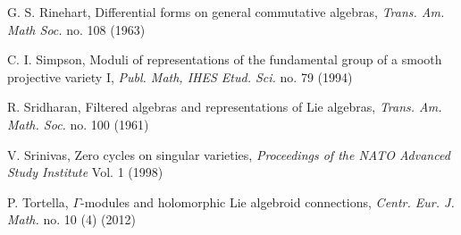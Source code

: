 \documentclass{amsart}
\theoremstyle{plain}
\theoremstyle{definition}
\theoremstyle{remark}
\numberwithin{equation}{theorem}
\begin{document}
\begin{thebibliography}{4}
 G. S. Rinehart, Differential forms on general commutative algebras, \emph{Trans. Am. Math Soc.}
no. 108 (1963)

 C. I. Simpson, Moduli of representations of the fundamental group of a smooth projective
variety I, \emph{Publ. Math, IHES Etud. Sci.} no. 79 (1994)

 R. Sridharan, Filtered algebras and representations of Lie algebras, \emph{Trans. Am. Math. Soc.}
no. 100 (1961)

 V. Srinivas, Zero cycles on singular varieties, \emph{Proceedings of the NATO Advanced Study Institute}
Vol. 1 (1998)

 P. Tortella, $\Gamma$-modules and holomorphic Lie algebroid connections, \emph{Centr. Eur. J. Math.} no.
10 (4) (2012)

\end{thebibliography}
\end{document}
